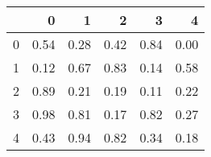 \begin{tabular}{lrrrrr}
\toprule
{} &    0 &    1 &    2 &    3 &    4 \\
\midrule
0 & 0.54 & 0.28 & 0.42 & 0.84 & 0.00 \\
1 & 0.12 & 0.67 & 0.83 & 0.14 & 0.58 \\
2 & 0.89 & 0.21 & 0.19 & 0.11 & 0.22 \\
3 & 0.98 & 0.81 & 0.17 & 0.82 & 0.27 \\
4 & 0.43 & 0.94 & 0.82 & 0.34 & 0.18 \\
\bottomrule
\end{tabular}
